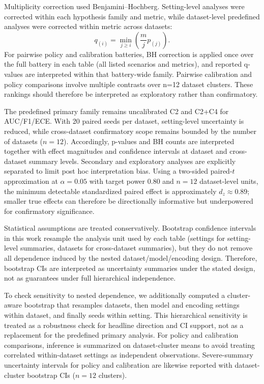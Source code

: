\documentclass{AuthorGuide/ijitcs}
\begin{document}
Multiplicity correction used Benjamini--Hochberg. Setting-level analyses were corrected within each hypothesis family and metric, while dataset-level predefined analyses were corrected within metric across datasets:
\begin{equation}
q_{(i)}=\min_{j\ge i}\left(\frac{m}{j}p_{(j)}\right).
\label{eq:bh}
\end{equation}
For pairwise policy and calibration batteries, BH correction is applied once over the full battery in each table (all listed scenarios and metrics), and reported q-values are interpreted within that battery-wide family.
Pairwise calibration and policy comparisons involve multiple contrasts over n=12 dataset clusters. These rankings should therefore be interpreted as exploratory rather than confirmatory.

The predefined primary family remains uncalibrated C2 and C2+C4 for AUC/F1/ECE. With 20 paired seeds per dataset, setting-level uncertainty is reduced, while cross-dataset confirmatory scope remains bounded by the number of datasets ($n=12$). Accordingly, p-values and BH counts are interpreted together with effect magnitudes and confidence intervals at dataset and cross-dataset summary levels. Secondary and exploratory analyses are explicitly separated to limit post hoc interpretation bias.
Using a two-sided paired-$t$ approximation at $\alpha=0.05$ with target power $0.80$ and $n=12$ dataset-level units, the minimum detectable standardized paired effect is approximately $d_z\approx 0.89$; smaller true effects can therefore be directionally informative but underpowered for confirmatory significance.

Statistical assumptions are treated conservatively. Bootstrap confidence intervals in this work resample the analysis unit used by each table (settings for setting-level summaries, datasets for cross-dataset summaries), but they do not remove all dependence induced by the nested dataset/model/encoding design. Therefore, bootstrap CIs are interpreted as uncertainty summaries under the stated design, not as guarantees under full hierarchical independence.

To check sensitivity to nested dependence, we additionally computed a cluster-aware bootstrap that resamples datasets, then model and encoding settings within dataset, and finally seeds within setting. This hierarchical sensitivity is treated as a robustness check for headline direction and CI support, not as a replacement for the predefined primary analysis. For policy and calibration comparisons, inference is summarized on dataset-cluster means to avoid treating correlated within-dataset settings as independent observations. Severe-summary uncertainty intervals for policy and calibration are likewise reported with dataset-cluster bootstrap CIs ($n=12$ clusters).
\end{document}
